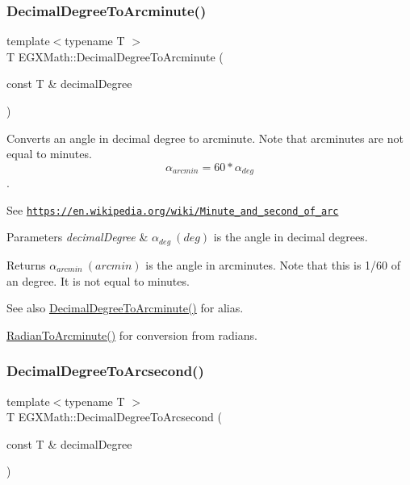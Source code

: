 \subsubsection{\texorpdfstring{Decimal\+Degree\+To\+Arcminute()}{DecimalDegreeToArcminute()}}
{\footnotesize\ttfamily template$<$typename T $>$ \\
T E\+G\+X\+Math\+::\+Decimal\+Degree\+To\+Arcminute (\begin{DoxyParamCaption}\item[{const T \&}]{decimal\+Degree }\end{DoxyParamCaption})}



Converts an angle in decimal degree to arcminute. Note that arcminutes are not equal to minutes. \[\alpha_{arcmin}= 60 * \alpha_{deg}\]. 

See \href{https://en.wikipedia.org/wiki/Minute_and_second_of_arc}{\tt https\+://en.\+wikipedia.\+org/wiki/\+Minute\+\_\+and\+\_\+second\+\_\+of\+\_\+arc} 
\begin{DoxyParams}{Parameters}
{\em decimal\+Degree} & $\alpha_{deg}\ (deg)$ is the angle in decimal degrees. \\
\hline
\end{DoxyParams}
\begin{DoxyReturn}{Returns}
$\alpha_{arcmin}\ (arcmin)$ is the angle in arcminutes. Note that this is 1/60 of an degree. It is not equal to minutes. 
\end{DoxyReturn}
\begin{DoxySeeAlso}{See also}
\mbox{\hyperlink{group___e_g_x_math-_angle_conversions-_decimal_degree_ga6b6ea6e45d2a13f556824ca419cc9fbd}{Decimal\+Degree\+To\+Arcminute()}} for alias. 

\mbox{\hyperlink{group___e_g_x_math-_angle_conversions-_radian_ga722e3b8e78540a6b3942b73b64aeb8d2}{Radian\+To\+Arcminute()}} for conversion from radians. 
\end{DoxySeeAlso}
\mbox{\label{group___e_g_x_math-_angle_conversions-_decimal_degree_gab9d5635a6e35127b5245978aba508962}} 
\subsubsection{\texorpdfstring{Decimal\+Degree\+To\+Arcsecond()}{DecimalDegreeToArcsecond()}}
{\footnotesize\ttfamily template$<$typename T $>$ \\
T E\+G\+X\+Math\+::\+Decimal\+Degree\+To\+Arcsecond (\begin{DoxyParamCaption}\item[{const T \&}]{decimal\+Degree }\end{DoxyParamCaption})}



